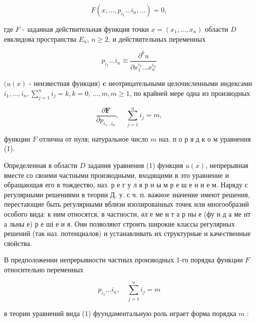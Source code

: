\documentclass[10pt]{article}
\begin{document}
\[

F\left(x, \ldots, p_{i_{1}} \ldots i_{n}, \ldots\right)=0,

\]



где $F$ - заданная действительная функция точки $x=\left(x_{1}, \ldots, x_{n}\right)$ области $D$ евклидова пространства $E_{n}$, $n \geqslant 2$, и действительных переменных



\[

p_{i_{1}} \ldots i_{n} \equiv \frac{\partial^{k} u}{\partial x_{1}^{i_{1}} \ldots x_{n}^{i_{n}}}

\]



$(u(x)$ - неизвестная функция) $\mathbf{c}$ неотрицательными целочисленными индексами $i_{1}, \ldots, i_{n}, \sum_{j=1}^{n} i_{j}=k, k=0$, $\ldots, m, m \geqslant 1$, по крайней мере одна из производных



\[

\frac{\partial \boldsymbol{F}}{\partial p_{i_{1} \ldots i_{n}}}, \quad \sum_{j=1}^{n} i_{j}=m,

\]



функции $F$ отлична от нуля; натуральное число $m$ наз. п о р я д к о м уравнения (1).



Определенная в области $D$ задания уравнения (1) функция $u(x)$, непрерывная вместе со своими частными производными, входящими в это уравнение и обращающая его в тождество, наз. р е г у л я р н ы м р е ш е н и е м. Наряду с регулярными решениями в теории Д. у. с ч. п. важное значение имеют решения, перестающие быть регулярными вблизи изолированных точек или многообразий особого вида: к ним относятся, в частности, әл е ме н т а р ны е (фу н д а ме нт а льны е) р е ші е и я. Они позволяют строить широкие классы регулярных решений (так наз. потенциалов) и устанавливать их структурные и качественные свойства.



В предположении непрерывности частных производных 1-го порядка функции $F$ относительно переменных



\[

p_{i_{1}} \ldots i_{n}, \quad \sum_{j=1}^{n} i_{j}=m

\]



в теории уравнений вида (1) фуундаментальную роль играет форма порядка $m$ :
\end{document}
